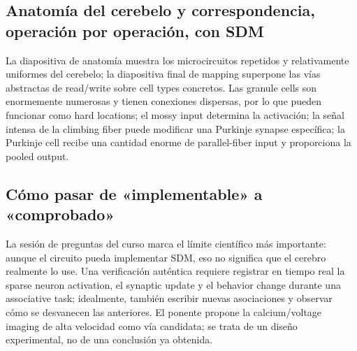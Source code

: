 \subsection{Anatomía del cerebelo y correspondencia, operación por operación, con SDM}

La diapositiva de anatomía muestra los microcircuitos repetidos y relativamente uniformes del cerebelo; la diapositiva final de mapping superpone las vías abstractas de read/write sobre cell types concretos. Las granule cells son enormemente numerosas y tienen conexiones dispersas, por lo que pueden funcionar como hard locations; el mossy input determina la activación; la señal intensa de la climbing fiber puede modificar una Purkinje synapse específica; la Purkinje cell recibe una cantidad enorme de parallel-fiber input y proporciona la pooled output.




\subsection{Cómo pasar de «implementable» a «comprobado»}

La sesión de preguntas del curso marca el límite científico más importante: aunque el circuito pueda implementar SDM, eso no significa que el cerebro realmente lo use. Una verificación auténtica requiere registrar en tiempo real la sparse neuron activation, el synaptic update y el behavior change durante una associative task; idealmente, también escribir nuevas asociaciones y observar cómo se desvanecen las anteriores. El ponente propone la calcium/voltage imaging de alta velocidad como vía candidata; se trata de un diseño experimental, no de una conclusión ya obtenida.

